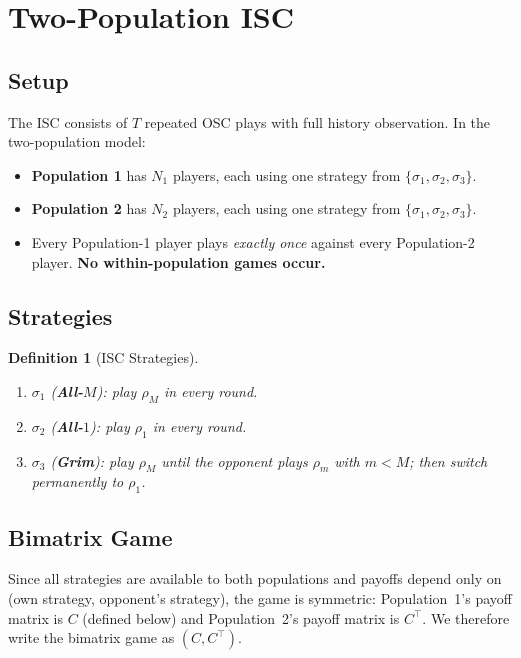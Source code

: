 \documentclass[12pt,a4paper]{article}
\newtheorem{definition}{Definition}[section]
\begin{document}
\section{Two-Population ISC}
\label{sec:ISC}

\subsection{Setup}

The ISC consists of $T$ repeated OSC plays with full history observation.
In the two-population model:
\begin{itemize}
  \item \textbf{Population 1} has $N_1$ players, each using one strategy from
        $\{\sigma_1,\sigma_2,\sigma_3\}$.
  \item \textbf{Population 2} has $N_2$ players, each using one strategy from
        $\{\sigma_1,\sigma_2,\sigma_3\}$.
  \item Every Population-1 player plays \emph{exactly once} against every
        Population-2 player.  \textbf{No within-population games occur.}
\end{itemize}

\subsection{Strategies}

\begin{definition}[ISC Strategies]\label{def:strats}
\hfill
\begin{enumerate}
  \item $\sigma_1$ (\textbf{All-$M$}): play $\rho_M$ in every round.
  \item $\sigma_2$ (\textbf{All-$1$}): play $\rho_1$ in every round.
  \item $\sigma_3$ (\textbf{Grim}): play $\rho_M$ until the opponent plays
        $\rho_m$ with $m<M$; then switch permanently to $\rho_1$.
\end{enumerate}
\end{definition}

\subsection{Bimatrix Game}

Since all strategies are available to both populations and payoffs depend only
on (own strategy, opponent's strategy), the game is symmetric:
Population~1's payoff matrix is $C$ (defined below) and Population~2's payoff
matrix is $C^\top$.  We therefore write the bimatrix game as $(C,C^\top)$.
\end{document}
